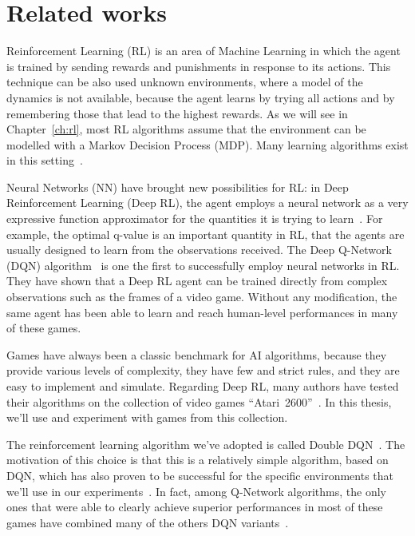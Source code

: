 \section{Related works}

\label{sec:intro-related}

Reinforcement Learning (RL) is an area of Machine Learning in which the agent
is trained by sending rewards and punishments in response to its actions.
This technique can be also used unknown environments, where a model of the
dynamics is not available, because the agent learns by trying all actions and
by remembering those that lead to the highest rewards. As we will see in
Chapter~\ref{ch:rl}, most RL algorithms assume that the environment can be
modelled with a Markov Decision Process (MDP). Many learning algorithms exist
in this setting~\cite{bib:rl-book}.

Neural Networks (NN) have brought new possibilities for RL: in Deep
Reinforcement Learning (Deep RL), the agent employs a neural network as a very
expressive function approximator for the quantities it is trying to
learn~\cite{bib:deep-rl}. For example, the optimal q-value is an important
quantity in RL, that the agents are usually designed to learn from the
observations received. The Deep Q-Network (DQN)
algorithm~\cite{bib:atari-deeprl} is one the first to successfully employ
neural networks in RL. They have shown that a Deep RL agent can be trained
directly from complex observations such as the frames of a video game. Without
any modification, the same agent has been able to learn and reach human-level
performances in many of these games.

Games have always been a classic benchmark for AI algorithms, because they
provide various levels of complexity, they have few and strict rules, and they
are easy to implement and simulate. Regarding Deep RL, many authors have
tested their algorithms on the collection of video games
``Atari~2600''~\cite{bib:atari-games}. In this thesis, we'll use and
experiment with games from this collection.

The reinforcement learning algorithm we've adopted is called Double
DQN~\cite{bib:double-q}. The motivation of this choice is that this is a
relatively simple algorithm, based on DQN, which has also proven to be
successful for the specific environments that we'll use in our
experiments~\cite{bib:atari-deepq-nature}. In fact, among Q-Network
algorithms, the only ones that were able to clearly achieve superior
performances in most of these games have combined many of the others DQN
variants~\cite{bib:rainbow}.

